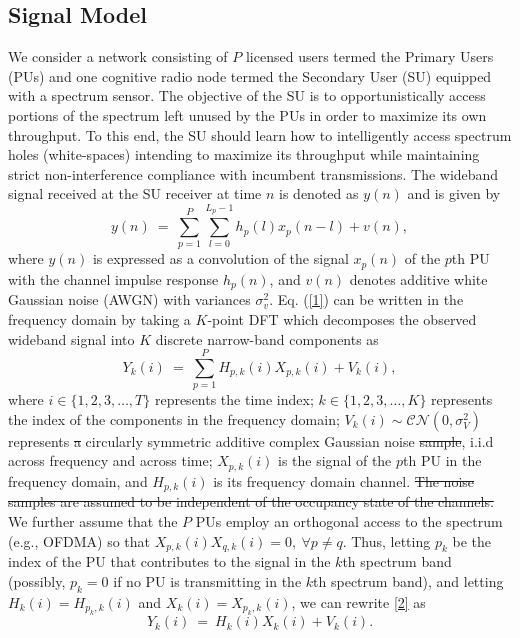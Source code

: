 \documentclass[10pt,twocolumn]{IEEEtran}
\newcommand{\sst}[1]{\st{#1}}
\newcommand{\add}[1]{{\color{red}{#1}}}
\begin{document}
\subsection{Signal Model}\label{A}
We consider a network consisting of $P$ licensed users termed the Primary Users (PUs) and one cognitive radio node termed the Secondary User (SU) equipped with a spectrum sensor. The objective of the SU is to opportunistically access portions of the spectrum left unused by the PUs in order to maximize its own throughput. To this end, the SU should learn how to intelligently access spectrum holes (white-spaces) intending to maximize its throughput while maintaining strict non-interference compliance with incumbent transmissions.
The wideband signal received at the SU receiver at time $n$ is denoted as $y(n)$ and is given by 
\begin{equation}\label{1}
    y(n)\ =\ \sum_{p=1}^{P}\sum_{l=0}^{L_{p}-1} h_{p}(l)x_{p}(n-l) + v(n),
\end{equation}
where $y(n)$ is expressed as a convolution of the signal $x_{p}(n)$ of the $p$th PU with the channel impulse response $h_{p}(n)$, and $v(n)$ denotes additive white Gaussian noise (AWGN) with variances $\sigma_v^2$. Eq. (\ref{1}) can be written in the frequency domain by taking a $K$-point DFT which decomposes the observed wideband signal into $K$ discrete narrow-band components as 
\begin{equation}\label{2}
    Y_k(i)\ =\ \sum_{p=1}^{P}H_{p,k}(i)X_{p,k}(i)+V_k(i),
\end{equation}
where $i {\in} \{1,2,3,\dots,T\}$ represents the time index; $k {\in} \{1,2,3,\dots,K\}$ represents the index of the components in the frequency domain; $V_k(i) {\sim} \mathcal{CN}(0,\sigma_V^2)$ represents\sst{ a} circularly symmetric additive complex Gaussian noise\sst{ sample}, i.i.d across frequency and across time\add{, and independent of $H$ and X}; $X_{p,k}(i)$ is the signal of the $p$th PU in the frequency domain, and $H_{p,k}(i)$ is its frequency domain channel.\sst{ The noise samples are assumed to be independent of the occupancy state of the channels.} We further assume that the $P$ PUs employ an orthogonal access to the spectrum (e.g., OFDMA) so that $X_{p,k}(i)X_{q,k}(i)=0,\ \forall p\neq q$. Thus, letting $p_k$ be the index of the PU that contributes to the signal in the $k$th spectrum band (possibly, $p_k=0$ if no PU is transmitting in the $k$th spectrum band), and letting  $H_{k}(i)=H_{p_k,k}(i)$ and $X_{k}(i)=X_{p_k,k}(i)$, we can rewrite \eqref{2} as 
\begin{equation}\label{3}
    Y_k(i)\ =\ H_{k}(i)X_{k}(i) + V_k(i).
\end{equation}
\end{document}
